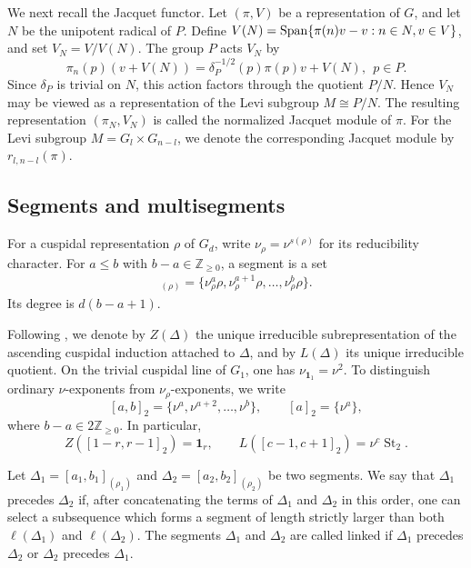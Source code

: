 \documentclass[11pt,leqno]{amsart}
\numberwithin{equation}{section}
\theoremstyle{plain}
\theoremstyle{definition}
\theoremstyle{remark}
\DeclareMathOperator{\St}{St}
\newcommand{\one}{\mathbf{1}}
\newcommand{\Z}{\mathbb{Z}}
\newcommand{\seg}[2]{[#1,#2]_2}
\newcommand{\sg}[1]{[#1]_2}
\begin{document}
	We next recall the Jacquet functor. Let $(\pi, V)$ be a representation of $G$, and let $N$ be the unipotent radical of 
	$P$.  Define $V(N)={\rm Span}\{ \pi(n)v-v: n \in N, v \in V\}$, and set $V_N=V/V(N)$. 
	The group $P$ acts $V_N$ by $$\pi_n(p)(v+V(N))=\delta_P^{-1/2}(p)\pi(p)v+V(N),  \ \ p \in P.$$
	Since $\delta_P$ is trivial on $N$, this action factors through the quotient $P/N$. 
	Hence $V_N$ may be viewed as a representation of the Levi subgroup
	$M\cong P/N$.
	The resulting representation $(\pi_N, V_N)$ is called the normalized Jacquet module of $\pi$.
	For the Levi subgroup $M=G_l \times G_{n-l}$, 
	we denote the corresponding Jacquet module by $r_{l,n-l}(\pi)$.
	
	\subsection{Segments and multisegments}
	
	For a cuspidal representation $\rho$ of $G_d$, write $\nu_\rho=\nu^{s(\rho)}$
	for its reducibility character.
	For $a\leq b$ with $b-a\in\Z_{\geq 0}$, a segment is a set
	\begin{align*}
		[a,b]_{(\rho)}
		=
		\{\nu_\rho^a\rho,\nu_\rho^{a+1}\rho,\ldots,\nu_\rho^b\rho\}.
	\end{align*}
	Its degree is $d(b-a+1)$.
	
	Following \cite[Section 2]{DSV}, we denote by $Z(\Delta)$
	the unique irreducible subrepresentation of the ascending
	cuspidal induction attached to $\Delta$, and by $L(\Delta)$
	its unique irreducible quotient.
	On the trivial cuspidal line of $G_1$, one has
	$\nu_{\one_1}=\nu^2$.
	To distinguish ordinary $\nu$-exponents from
	$\nu_\rho$-exponents, we write
	\[
	\seg{a}{b}
	=
	\{\nu^a,\nu^{a+2},\ldots,\nu^b\},
	\qquad
	\sg{a}=\{\nu^a\},
	\]
	where $b-a\in 2\Z_{\geq 0}$.
	In particular,
	\begin{equation}\label{eq:segment-examples}
		Z(\seg{1-r}{r-1})=\one_r,
		\qquad
		L(\seg{c-1}{c+1})=\nu^c\St_2.
	\end{equation}
	
	
	Let $\Delta_1=[a_1, b_1]_{(\rho_1)}$ and $\Delta_2=[a_2,b_2]_{(\rho_2)}$
	be two segments. We say that $\Delta_1$ precedes $\Delta_2$ if,
	after concatenating the terms of $\Delta_1$ and $\Delta_2$ in this
	order, one can select a subsequence which forms a segment of length
	strictly larger than both $\ell(\Delta_1)$ and $\ell(\Delta_2)$.
	The segments $\Delta_1$ and $\Delta_2$ are called linked if
	$\Delta_1$ precedes $\Delta_2$ or $\Delta_2$ precedes $\Delta_1$.
	
\end{document}
